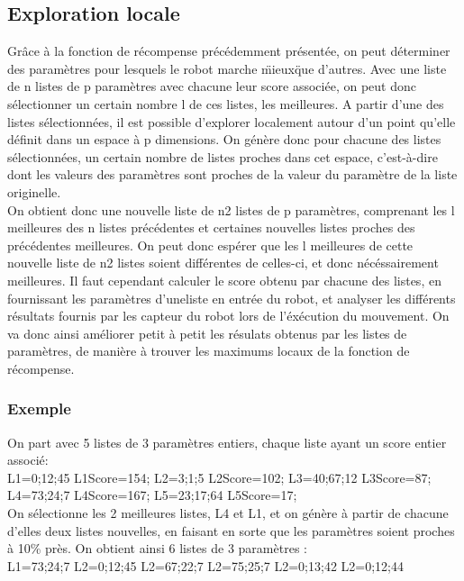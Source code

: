 \documentclass[11pt]{article}
\begin{document}
\subsection{Exploration locale}
Grâce à la fonction de récompense précédemment présentée, on peut déterminer des paramètres pour lesquels le robot marche \"mieux\" que d'autres. Avec une liste de n listes de p paramètres avec chacune leur score associée, on peut donc sélectionner un certain nombre l de ces listes, les meilleures. A partir d'une des listes sélectionnées, il est possible d'explorer localement autour d'un point qu'elle définit dans un espace à p dimensions. On génère donc pour chacune des listes sélectionnées, un certain nombre de listes proches dans cet espace, c'est-à-dire dont les valeurs des paramètres sont proches de la valeur du paramètre de la liste originelle.\\
On obtient donc une nouvelle liste de n2 listes de p paramètres, comprenant les l meilleures des n listes précédentes et certaines nouvelles listes proches des précédentes meilleures. On peut donc espérer que les l meilleures de cette nouvelle liste de n2 listes soient différentes de celles-ci, et donc nécéssairement meilleures. Il faut cependant calculer le score obtenu par chacune des listes, en fournissant les paramètres d'uneliste en entrée du robot, et analyser les différents résultats fournis par les capteur du robot lors de l'éxécution du mouvement. On va donc ainsi améliorer petit à petit les résulats obtenus par les listes de paramètres, de manière à trouver les maximums locaux de la fonction de récompense.\\

\subsubsection{Exemple} 
On part avec 5 listes de 3 paramètres entiers, chaque liste ayant un score entier associé:\\
L1={0;12;45}
L1Score=154;
L2={3;1;5}
L2Score=102;
L3={40;67;12}
L3Score=87;
L4={73;24;7}
L4Score=167;
L5={23;17;64}
L5Score=17;\\

On sélectionne les 2 meilleures listes, L4 et L1, et on génère à partir de chacune d'elles deux listes nouvelles, en faisant en sorte que les paramètres soient proches à 10\% près. On obtient ainsi 6 listes de 3 paramètres :\\

L1={73;24;7}
L2={0;12;45}
L2={67;22;7}
L2={75;25;7}
L2={0;13;42}
L2={0;12;44}
\end{document}
